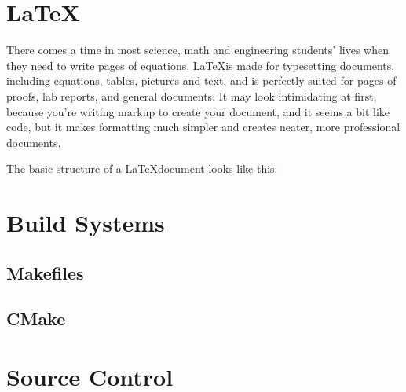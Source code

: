 \documentclass[12pt]{book}
\begin{document}
	\chapter{\LaTeX}
		There comes a time in most science, math and engineering students' lives when they need to write pages of equations. \LaTeX is made for typesetting documents, including equations, tables, pictures and text, and is perfectly suited for pages of proofs, lab reports, and general documents.  It may look intimidating at first, because you're writing markup to create your document, and it seems a bit like code, but it makes formatting much simpler and creates neater, more professional documents.
		
		The basic structure of a \LaTeX document looks like this:
		
	\chapter{Build Systems}
		\section{Makefiles}
		\section{CMake}
		
	\chapter{Source Control}
\end{document}
